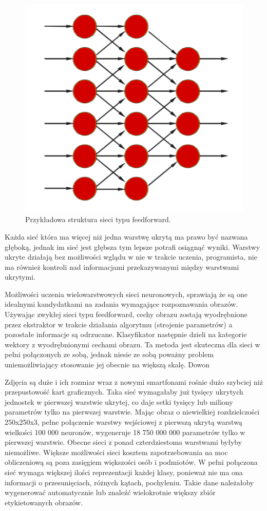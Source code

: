 \documentclass[12pt,a4paper,twoside,titlepage,openright]{book}
\begin{document}
\begin{figure}[ht]
	\centering
			\includegraphics[resolution=100, scale=0.6]{feedforwardNetwork.png}
		\caption{Przykładowa struktura sieci typu feedforward.}
\end{figure}

Każda sieć która ma więcej niż jedna warstwę ukrytą ma prawo być nazwana głęboką, jednak im sieć jest głębsza tym lepsze potrafi osiągnąć wyniki. Warstwy ukryte działają bez możliwości wglądu w nie w trakcie uczenia, programista, nie ma również kontroli nad informacjami przekazywanymi między warstwami ukrytymi.

Możliwości uczenia wielowarstwowych sieci neuronowych, sprawiają że są one idealnymi kandydatkami na zadania wymagające rozpoznawania obrazów. Używając zwykłej sieci typu feedforward, cechy obrazu zostają wyodrębnione przez ekstraktor w trakcie działania algorytmu (strojenie parametrów) a pozostałe informacje są odrzucane. Klasyfikator następnie dzieli na kategorie wektory z wyodrębnionymi cechami obrazu. Ta metoda jest skuteczna dla sieci w pełni połączonych ze sobą, jednak niesie ze sobą poważny problem uniemożliwiający stosowanie jej obecnie na większą skalę. Dowon

Zdjęcia są duże i ich rozmiar wraz z nowymi smartfonami rośnie dużo szybciej niż przepustowość kart graficznych. Taka sieć wymagałaby już tysięcy ukrytych jednostek w pierwszej warstwie ukrytej, co daje setki tysięcy lub miliony parametrów tylko na pierwszej warstwie. Mając obraz o niewielkiej rozdzielczości 250x250x3, pełne połączenie warstwy wejściowej z pierwszą ukrytą warstwą wielkości 100 000 neuronów, wygeneruje 18 750 000 000 parametrów tylko w pierwszej warstwie. Obecne sieci z ponad czterdziestoma warstwami byłyby niemożliwe. Większe możliwości sieci kosztem zapotrzebowania na moc obliczeniową są poza zasięgiem większości osób i podmiotów. W pełni połączona sieć wymaga większej ilości reprezentacji każdej klasy, ponieważ nie ma ona informacji o przesunięciach, różnych kątach, pochyleniu. Takie dane należałoby wygenerować automatycznie lub znaleźć wielokrotnie większy zbiór etykietowanych obrazów.
\end{document}
